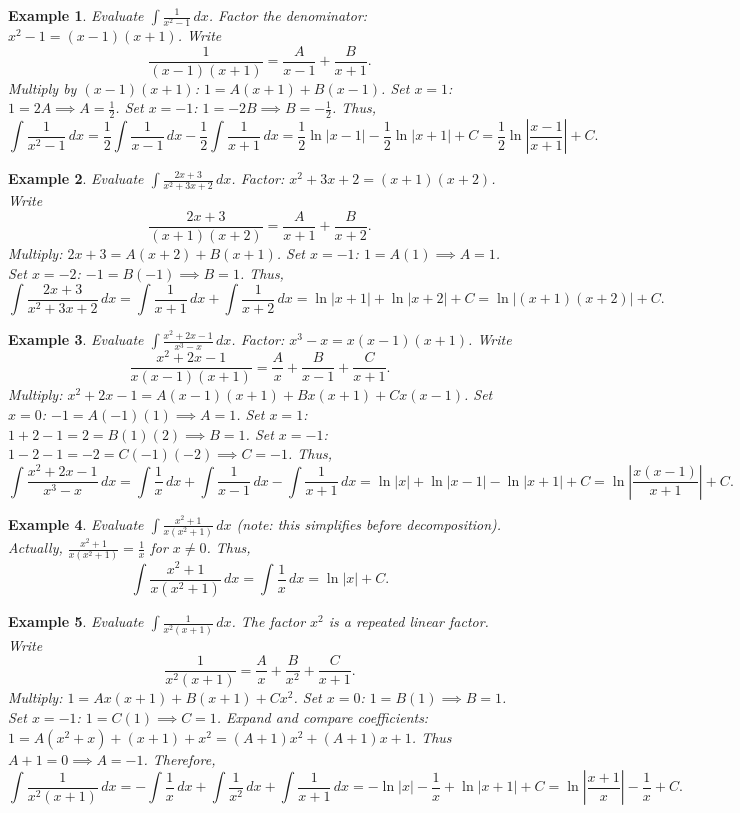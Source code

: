 \documentclass[11pt,a4paper]{article}
\newtheorem{example}{Example}
\begin{document}
\begin{example}
Evaluate $\displaystyle \int \frac{1}{x^2 - 1} \, dx$.
Factor the denominator: $x^2 - 1 = (x - 1)(x + 1)$. Write
\[
\frac{1}{(x-1)(x+1)} = \frac{A}{x-1} + \frac{B}{x+1}.
\]
Multiply by $(x-1)(x+1)$: $1 = A(x+1) + B(x-1)$.
Set $x = 1$: $1 = 2A \implies A = \frac{1}{2}$.
Set $x = -1$: $1 = -2B \implies B = -\frac{1}{2}$.
Thus,
\[
\int \frac{1}{x^2 - 1} \, dx = \frac{1}{2} \int \frac{1}{x-1} \, dx - \frac{1}{2} \int \frac{1}{x+1} \, dx = \frac{1}{2} \ln|x-1| - \frac{1}{2} \ln|x+1| + C = \frac{1}{2} \ln\left| \frac{x-1}{x+1} \right| + C.
\]
\end{example}
\begin{example}
Evaluate $\displaystyle \int \frac{2x + 3}{x^2 + 3x + 2} \, dx$.
Factor: $x^2 + 3x + 2 = (x+1)(x+2)$. Write
\[
\frac{2x + 3}{(x+1)(x+2)} = \frac{A}{x+1} + \frac{B}{x+2}.
\]
Multiply: $2x + 3 = A(x+2) + B(x+1)$.
Set $x = -1$: $1 = A(1) \implies A = 1$.
Set $x = -2$: $-1 = B(-1) \implies B = 1$.
Thus,
\[
\int \frac{2x + 3}{x^2 + 3x + 2} \, dx = \int \frac{1}{x+1} \, dx + \int \frac{1}{x+2} \, dx = \ln|x+1| + \ln|x+2| + C = \ln|(x+1)(x+2)| + C.
\]
\end{example}
\begin{example}
Evaluate $\displaystyle \int \frac{x^2 + 2x - 1}{x^3 - x} \, dx$.
Factor: $x^3 - x = x(x-1)(x+1)$. Write
\[
\frac{x^2 + 2x - 1}{x(x-1)(x+1)} = \frac{A}{x} + \frac{B}{x-1} + \frac{C}{x+1}.
\]
Multiply: $x^2 + 2x - 1 = A(x-1)(x+1) + Bx(x+1) + Cx(x-1)$.
Set $x = 0$: $-1 = A(-1)(1) \implies A = 1$.
Set $x = 1$: $1 + 2 - 1 = 2 = B(1)(2) \implies B = 1$.
Set $x = -1$: $1 - 2 - 1 = -2 = C(-1)(-2) \implies C = -1$.
Thus,
\[
\int \frac{x^2 + 2x - 1}{x^3 - x} \, dx = \int \frac{1}{x} \, dx + \int \frac{1}{x-1} \, dx - \int \frac{1}{x+1} \, dx = \ln|x| + \ln|x-1| - \ln|x+1| + C = \ln\left| \frac{x(x-1)}{x+1} \right| + C.
\]
\end{example}
\begin{example}
Evaluate $\displaystyle \int \frac{x^2 + 1}{x(x^2 + 1)} \, dx$ (note: this simplifies before decomposition).
Actually, $\frac{x^2 + 1}{x(x^2 + 1)} = \frac{1}{x}$ for $x \neq 0$. Thus,
\[
\int \frac{x^2 + 1}{x(x^2 + 1)} \, dx = \int \frac{1}{x} \, dx = \ln|x| + C.
\]
\end{example}
\begin{example}
Evaluate $\displaystyle \int \frac{1}{x^2(x+1)} \, dx$.
The factor $x^2$ is a repeated linear factor. Write
\[
\frac{1}{x^2(x+1)} = \frac{A}{x} + \frac{B}{x^2} + \frac{C}{x+1}.
\]
Multiply: $1 = Ax(x+1) + B(x+1) + Cx^2$.
Set $x = 0$: $1 = B(1) \implies B = 1$.
Set $x = -1$: $1 = C(1) \implies C = 1$.
Expand and compare coefficients: $1 = A(x^2 + x) + (x+1) + x^2 = (A+1)x^2 + (A+1)x + 1$.
Thus $A+1 = 0 \implies A = -1$.
Therefore,
\[
\int \frac{1}{x^2(x+1)} \, dx = -\int \frac{1}{x} \, dx + \int \frac{1}{x^2} \, dx + \int \frac{1}{x+1} \, dx = -\ln|x| - \frac{1}{x} + \ln|x+1| + C = \ln\left| \frac{x+1}{x} \right| - \frac{1}{x} + C.
\]
\end{example}
\end{document}
